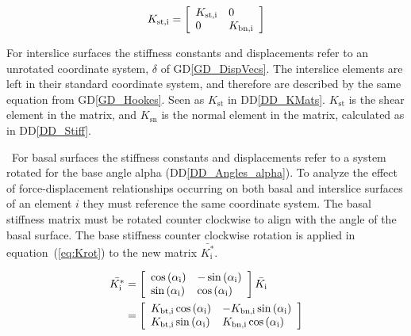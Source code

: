 \documentclass[12pt]{article}
\newcommand{\ddref}[1]{DD\ref{#1}}
\newcommand{\dref}[1]{GD\ref{#1}}
\begin{document}
\begin{equation} \label{eq:Kmat}
  {K_\text{st,i}} = \left[ \begin{array}{l l}
      K_\text{st,i} & 0 \\ 0 & K_\text{bn,i}\end{array} \right]
\end{equation}

\noindent
For interslice surfaces the stiffness constants and displacements
refer to an unrotated coordinate system, ${\delta}$ of
\dref{GD_DispVecs}. The interslice elements are left in their standard
coordinate system, and therefore are described by the same equation
from \dref{GD_Hookes}. Seen as ${K}_\text{st}$ in
\ddref{DD_KMats}. $K_\text{st}$ is the shear element in the matrix,
and $K_\text{sn}$ is the normal element in the matrix, calculated as
in \ddref{DD_Stiff}.

~\newline\noindent For basal surfaces the stiffness constants and
displacements refer to a system rotated for the base angle alpha
(\ddref{DD_Angles_alpha}). To analyze the effect of force-displacement
relationships occurring on both basal and interslice surfaces of an
element $i$ they must reference the same coordinate system. The
basal stiffness matrix must be rotated counter clockwise to align with
the angle of the basal surface. The base stiffness counter clockwise
rotation is applied in equation~(\ref{eq:Krot}) to the new matrix
$\bar{K^*_\text{i}}$.


\begin{equation} \label{eq:Krot}
  \begin{aligned} \bar{K^*_\text{i}} & = 
   \left[ \begin{array}{l l} \cos\left(\alpha_\text{i}\right) & -
       \sin\left(\alpha_\text{i}\right)\\ \sin\left(\alpha_\text{i}\right)
       & \cos\left(\alpha_\text{i}\right)\end{array} \right]
   \bar{K_\text{i}}\\ {} & = \left[ \begin{array}{l l} K_\text{bt,i}
       \cos\left(\alpha_\text{i}\right) & - K_\text{bn,i}
       \sin\left(\alpha_\text{i}\right)\\ K_\text{bt,i}
       \sin\left(\alpha_\text{i}\right) & K_\text{bn,i}
       \cos\left(\alpha_\text{i}\right)\end{array}\right]
  \end{aligned} \end{equation}
\end{document}
